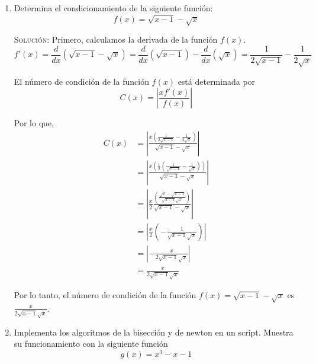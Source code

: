 \documentclass[letterpaper,11pt]{article}
\begin{document}
\begin{enumerate}
    \item Determina el condicionamiento de la siguiente función:
    \begin{equation*}
        f(x) = \sqrt{x - 1} - \sqrt{x}
    \end{equation*}

    \textsc{Solución:} Primero, calculamos la derivada de la función $f(x)$.
    \begin{equation*}
        f'(x) 
        = \frac{d}{dx} (\sqrt{x - 1} - \sqrt{x}) 
        = \frac{d}{dx} (\sqrt{x - 1}) - \frac{d}{dx} (\sqrt{x}) 
        = \frac{1}{2 \sqrt{x - 1}} - \frac{1}{2 \sqrt{x}} 
    \end{equation*}

    El número de condición de la función $f(x)$ está determinada por 
    \begin{equation*}
        C(x) = \left| \frac{x f'(x)}{f(x)} \right|
    \end{equation*}

    Por lo que, 
    \begin{align*}
        C(x) &= \left| \frac{x \left(\frac{1}{2 \sqrt{x - 1}} - 
                                     \frac{1}{2 \sqrt{x}}\right)}
                            {\sqrt{x - 1} - \sqrt{x}} \right| \\ 
             &= \left| \frac{x \left(\frac{1}{2} 
                                     \left(\frac{1}{\sqrt{x - 1}} - 
                                           \frac{1}{\sqrt{x}}\right) \right)}
                            {\sqrt{x - 1} - \sqrt{x}} \right| \\ 
             &= \left| \frac{x}{2} \frac{\left(\frac{\sqrt{x} - \sqrt{x-1}}
                                                    {\sqrt{x-1} \sqrt{x}}\right)}
                            {\sqrt{x - 1} - \sqrt{x}} \right| \\ 
             &= \left| \frac{x}{2} \left(- \frac{1}
                                                {\sqrt{x - 1} \sqrt{x}}\right) \right| \\ 
             &= \left|- \frac{x}{2 \sqrt{x - 1} \sqrt{x}} \right| \\ 
             &= \frac{x}{2 \sqrt{x - 1} \sqrt{x}} 
    \end{align*}

    Por lo tanto, el número de condición de la función 
    $f(x) = \sqrt{x - 1} - \sqrt{x}$ es $\frac{x}{2 \sqrt{x - 1} \sqrt{x}}$. 

    \item Implementa los algoritmos de la bisección y de newton en un 
    script. Muestra su funcionamiento con la siguiente función 
    \begin{equation*}
        g(x) = x^3 - x - 1
    \end{equation*}


\end{enumerate}
\end{document}
